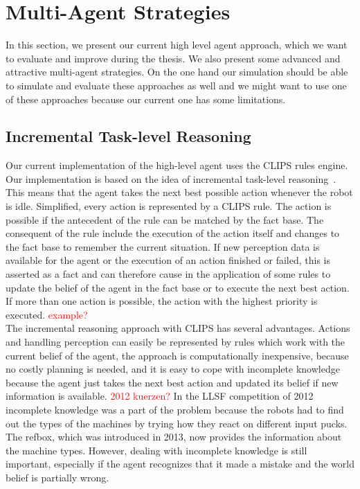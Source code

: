 \section{Multi-Agent Strategies}
In this section, we present our current high level agent approach, which we want to evaluate and improve during the thesis. We also present some advanced and attractive multi-agent strategies. On the one hand our simulation should be able to simulate and evaluate these approaches as well and we might want to use one of these approaches because our current one has some limitations.

\subsection{Incremental Task-level Reasoning}
Our current implementation of the high-level agent uses the CLIPS rules engine. Our implementation is based on the idea of incremental task-level reasoning~\cite{Incremental}. This means that the agent takes the next best possible action whenever the robot is idle. Simplified, every action is represented by a CLIPS rule. The action is possible if the antecedent of the rule can be matched by the fact base. The consequent of the rule include the execution of the action itself and changes to the fact base to remember the current situation. If new perception data is available for the agent or the execution of an action finished or failed, this is asserted as a fact and can therefore cause in the application of some rules to update the belief of the agent in the fact base or to execute the next best action. If more than one action is possible, the action with the highest priority is executed. \textcolor{red}{example?}\\
The incremental reasoning approach with CLIPS has several advantages. Actions and handling perception can easily be represented by rules which work with the current belief of the agent, the approach is computationally inexpensive, because no costly planning is needed, and it is easy to cope with incomplete knowledge because the agent just takes the next best action and updated its belief if new information is available. \textcolor{red}{2012 kuerzen?} In the LLSF competition of 2012 incomplete knowledge was a part of the problem because the robots had to find out the types of the machines by trying how they react on different input pucks. The refbox, which was introduced in 2013, now provides the information about the machine types. However, dealing with incomplete knowledge is still important, especially if the agent recognizes that it made a mistake and the world belief is partially wrong.\\
